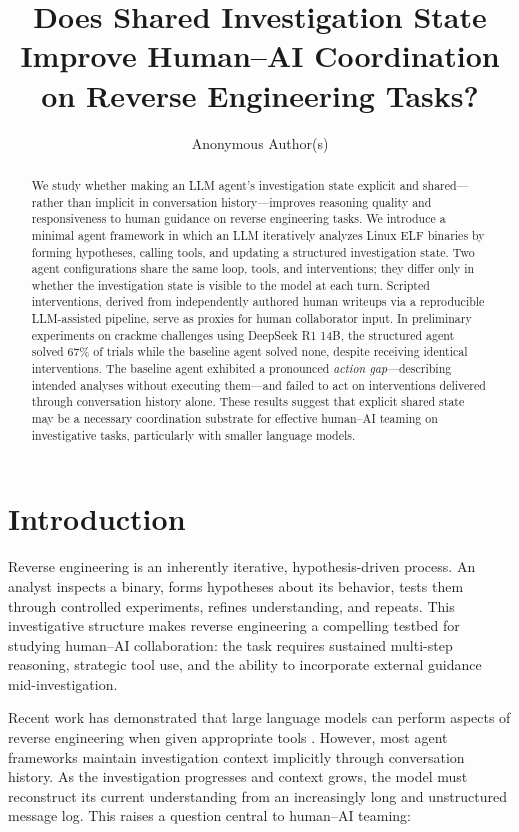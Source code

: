 \documentclass[letterpaper]{article}
\title{Does Shared Investigation State Improve Human--AI Coordination\\on Reverse Engineering Tasks?}
\author{
    Anonymous Author(s)
}
\begin{document}
\maketitle

\begin{abstract}
We study whether making an LLM agent's investigation state explicit and shared---rather than implicit in conversation history---improves reasoning quality and responsiveness to human guidance on reverse engineering tasks.
We introduce a minimal agent framework in which an LLM iteratively analyzes Linux ELF binaries by forming hypotheses, calling tools, and updating a structured investigation state.
Two agent configurations share the same loop, tools, and interventions; they differ only in whether the investigation state is visible to the model at each turn.
Scripted interventions, derived from independently authored human writeups via a reproducible LLM-assisted pipeline, serve as proxies for human collaborator input.
In preliminary experiments on crackme challenges using DeepSeek R1 14B, the structured agent solved 67\% of trials while the baseline agent solved none, despite receiving identical interventions.
The baseline agent exhibited a pronounced \emph{action gap}---describing intended analyses without executing them---and failed to act on interventions delivered through conversation history alone.
These results suggest that explicit shared state may be a necessary coordination substrate for effective human--AI teaming on investigative tasks, particularly with smaller language models.
\end{abstract}

\section{Introduction}

Reverse engineering is an inherently iterative, hypothesis-driven process.
An analyst inspects a binary, forms hypotheses about its behavior, tests them through controlled experiments, refines understanding, and repeats.
This investigative structure makes reverse engineering a compelling testbed for studying human--AI collaboration: the task requires sustained multi-step reasoning, strategic tool use, and the ability to incorporate external guidance mid-investigation.

Recent work has demonstrated that large language models can perform aspects of reverse engineering when given appropriate tools \citep{shao2024nyx, yang2024rag}.
However, most agent frameworks maintain investigation context implicitly through conversation history.
As the investigation progresses and context grows, the model must reconstruct its current understanding from an increasingly long and unstructured message log.
This raises a question central to human--AI teaming:
\end{document}
